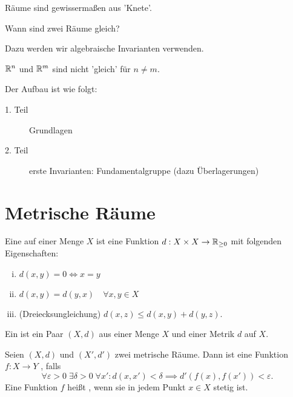 \begin{idea}
    Räume sind gewissermaßen aus 'Knete'.
\end{idea}
\begin{goal}
    Wann sind zwei Räume gleich?
\end{goal}
Dazu werden wir algebraische Invarianten verwenden.
\begin{example}
    $\mathbb{R}^n$ und $\mathbb{R}^m$ sind nicht 'gleich' für $n\neq m$.
\end{example}
Der Aufbau ist wie folgt:
\begin{description}
    \item[1. Teil] Grundlagen
    \item[2. Teil] erste Invarianten: Fundamentalgruppe (dazu Überlagerungen)
\end{description}

\section{Metrische Räume}
\begin{definition}[Metrik]\label{def:metrik}
    Eine  auf einer Menge $X$ ist eine Funktion  $d: X\times X \to  \mathbb{R}_{\geq 0}$ mit folgenden Eigenschaften:
    \begin{enumerate}[(i)]
        \item $d(x,y) = 0 \iff  x = y$
        \item $d(x,y) = d(y,x) \quad \forall x,y\in X$
        \item (Dreiecksungleichung) $d(x,z) \leq  d(x,y) + d(y,z)$.
    \end{enumerate}
    Ein  ist ein Paar $(X,d)$ aus einer Menge $X$ und einer Metrik $d$ auf $X$.
\end{definition}

\begin{definition}[Stetigkeit]\label{def:stetig-metrischer-raum}
    Seien $(X,d)$ und  $(X',d')$ zwei metrische Räume. Dann ist eine Funktion $f:X \to  Y$ , falls
    \[
        \forall ε > 0 \; \exists \delta > 0 \; \forall x' \colon d(x,x') < \delta \implies d'(f(x), f(x')) < ε
    .\] 
    Eine Funktion $f$ heißt , wenn sie in jedem Punkt  $x\in X$ stetig ist.
    \begin{minipage}{\textwidth}
        \centering
    \end{minipage}
\end{definition}


